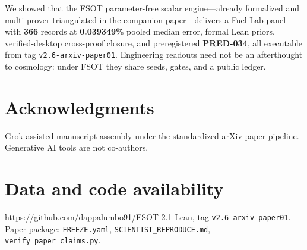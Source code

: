 \documentclass[11pt,a4paper]{article}
\begin{document}
We showed that the FSOT parameter-free scalar engine---already formalized and
multi-prover triangulated in the companion paper---delivers a Fuel Lab panel
with \textbf{366} records at \textbf{0.039349\%} pooled median error, formal
Lean priors, verified-desktop cross-proof closure, and preregistered
\textbf{PRED-034}, all executable from tag \texttt{v2.6-arxiv-paper01}.
Engineering readouts need not be an afterthought to cosmology: under FSOT they
share seeds, gates, and a public ledger.

\section*{Acknowledgments}
Grok assisted manuscript assembly under the standardized arXiv paper pipeline.
Generative AI tools are not co-authors.

\section*{Data and code availability}
\url{https://github.com/dappalumbo91/FSOT-2.1-Lean},
tag \texttt{v2.6-arxiv-paper01}.
Paper package: \texttt{FREEZE.yaml}, \texttt{SCIENTIST\_REPRODUCE.md},
\texttt{verify\_paper\_claims.py}.



\end{document}
